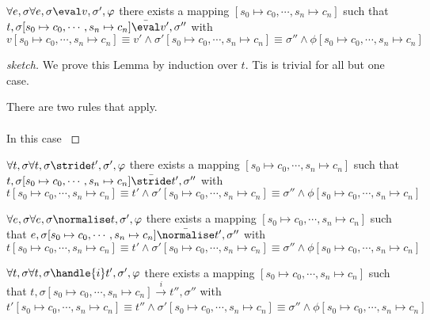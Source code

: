 \begin{lemma}
  $\forall e,\sigma \forall e,\sigma\eval v,\sigma',\phi$
  there exists a mapping $[s_0\mapsto c_0,\cdots,s_n\mapsto c_n]$
  such that $t,\sigma [s_0\mapsto c_0,\cdots,s_n\mapsto c_n] \bar{\eval}v',\sigma''$
  with $v[s_0\mapsto c_0,\cdots,s_n\mapsto c_n] \equiv v' \wedge \sigma' [s_0\mapsto c_0,\cdots,s_n\mapsto c_n] \equiv \sigma'' \wedge \phi [s_0\mapsto c_0,\cdots,s_n\mapsto c_n]$
\end{lemma}

\begin{proof}[sketch]
  We prove this Lemma by induction over $t$. Tis is trivial for all but one case.

       {There are two rules that apply.\\
       \\
       In this case }
\end{proof}

\begin{lemma}
  $\forall t,\sigma \forall t,\sigma\stride t',\sigma',\phi$
  there exists a mapping $[s_0\mapsto c_0,\cdots,s_n\mapsto c_n]$
  such that $t,\sigma [s_0\mapsto c_0,\cdots,s_n\mapsto c_n] \bar{\stride}t',\sigma''$
  with $t[s_0\mapsto c_0,\cdots,s_n\mapsto c_n] \equiv t' \wedge \sigma' [s_0\mapsto c_0,\cdots,s_n\mapsto c_n] \equiv \sigma'' \wedge \phi [s_0\mapsto c_0,\cdots,s_n\mapsto c_n]$
\end{lemma}

\begin{lemma}
  $\forall e,\sigma \forall e,\sigma\normalise t,\sigma',\phi$
  there exists a mapping $[s_0\mapsto c_0,\cdots,s_n\mapsto c_n]$
  such that $e,\sigma [s_0\mapsto c_0,\cdots,s_n\mapsto c_n] \bar{\normalise}t',\sigma''$
  with $t[s_0\mapsto c_0,\cdots,s_n\mapsto c_n] \equiv t' \wedge \sigma' [s_0\mapsto c_0,\cdots,s_n\mapsto c_n] \equiv \sigma'' \wedge \phi [s_0\mapsto c_0,\cdots,s_n\mapsto c_n]$
\end{lemma}

\begin{lemma}
  $\forall t,\sigma \forall t,\sigma\handle{i} t',\sigma',\phi$
  there exists a mapping $[s_0\mapsto c_0,\cdots,s_n\mapsto c_n]$
  such that $t,\sigma [s_0\mapsto c_0,\cdots,s_n\mapsto c_n] \xrightarrow[]{i} t'',\sigma''$
  with $t'[s_0\mapsto c_0,\cdots,s_n\mapsto c_n] \equiv t'' \wedge \sigma' [s_0\mapsto c_0,\cdots,s_n\mapsto c_n] \equiv \sigma'' \wedge \phi [s_0\mapsto c_0,\cdots,s_n\mapsto c_n]$
\end{lemma}


